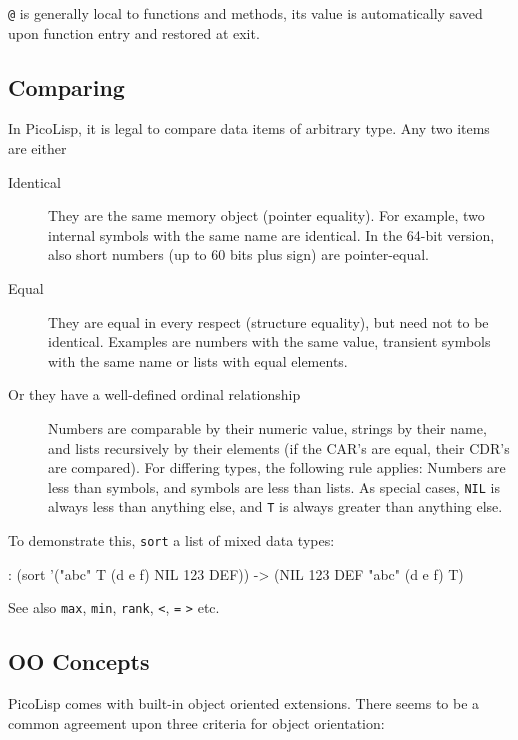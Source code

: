 \texttt{@} is generally local to functions and methods, its value is
automatically saved upon function entry and restored at exit.

\subsection{Comparing}
\label{sec:refm-comparing}


In PicoLisp, it is legal to compare data items of arbitrary type. Any
two items are either

\begin{description}
\item[Identical] They are the same memory object (pointer equality).
  For example, two internal symbols with the same name are identical.
  In the 64-bit version, also short numbers (up to 60 bits plus sign)
  are pointer-equal.
\item[Equal] They are equal in every respect (structure equality), but
  need not to be identical. Examples are numbers with the same value,
  transient symbols with the same name or lists with equal elements.
\item[Or they have a well-defined ordinal relationship] Numbers are
  comparable by their numeric value, strings by their name, and lists
  recursively by their elements (if the CAR's are equal, their CDR's
  are compared). For differing types, the following rule applies:
  Numbers are less than symbols, and symbols are less than lists. As
  special cases, \texttt{NIL} is always less than anything else, and
  \texttt{T} is always greater than anything else.
\end{description}

To demonstrate this, \texttt{sort} a list of mixed data types:

\begin{wideverbatim}
: (sort '("abc" T (d e f) NIL 123 DEF))
-> (NIL 123 DEF "abc" (d e f) T)
\end{wideverbatim}

See also \texttt{max}, \texttt{min}, \texttt{rank}, \texttt{<}, \texttt{=}  \texttt{>} etc.

 
\subsection{OO Concepts}
\label{sec:refm-oo-concepts}

PicoLisp comes with built-in object oriented extensions. There seems to
be a common agreement upon three criteria for object orientation:

